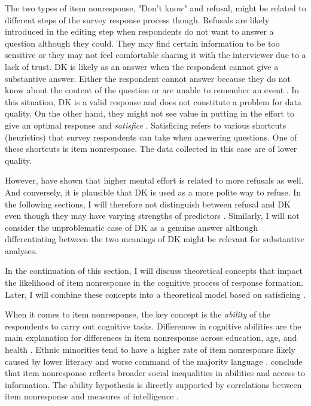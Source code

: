 \documentclass[a4paper,12pt]{article}
\begin{document}
The two types of item nonresponse, "Don't know" and refusal, might be related to different steps of the survey response process though. Refusals are likely introduced in the editing step when respondents do not want to answer a question although they could. They may find certain information to be too sensitive or they may not feel comfortable sharing it with the interviewer due to a lack of trust. DK is likely as an answer when the respondent cannot give a substantive answer. Either the respondent cannot answer because they do not know about the content of the question or are unable to remember an event \citep{beattyAnswerNotAnwer2002, turnerCanResponseLatencies2015}. In this situation, DK is a valid response and does not constitute a problem for data quality.
On the other hand, they might not see value in putting in the effort to give an optimal response and \textit{satisfice} \citep{krosnickResponseStrategiesCoping1991}. Satisficing refers to various shortcuts (heuristics) that survey respondents can take when answering questions. One of these shortcuts is item nonresponse. The data collected in this case are of lower quality.

However, \citet{shoemakerItemNonresponseDistinguishing2002}  have
shown that higher mental effort is related to more refusals as well. And
conversely, it is plausible that DK is used as a more polite way to refuse.
In the following sections, I will therefore not distinguish between refusal and DK even though they may have varying strengths of predictors \citep{silberEffectsQuestionRespondent2021}. Similarly, I will not consider the unproblematic case of DK as a genuine answer although differentiating between the two meanings of DK might be relevant for substantive analyses.

In the continuation of this section, I will discuss theoretical concepts that impact the likelihood of item nonresponse in the cognitive process of response formation. Later, I will combine these concepts into a theoretical model based on satisficing \citep{krosnickResponseStrategiesCoping1991}.

When it comes to item nonresponse, the key concept is the \textit{ability} of the respondents to carry out cognitive tasks. Differences in cognitive abilities are the main explanation for differences in item nonresponse across education, age, and health \citep{colsherDataQualityAge1989, pickeryImpactRespondentInterviewer1998, deleeuwPreventionTreatmentItem2003, messerDeterminantsItemNonresponse2012, silberEffectsQuestionRespondent2021}. Ethnic minorities tend to have a higher rate of item nonresponse likely caused by lower literacy and worse command of the majority language \citep{kupekDeterminantsItemNonresponse1998, pickeryImpactRespondentInterviewer1998}. \citet{meitingerPowerCultureItem2020} conclude that item nonresponse reflects broader social inequalities in abilities and access to information. The ability hypothesis is directly supported by correlations between item nonresponse and measures of intelligence \citep{hedengrenDogThatDidn2012}.
\end{document}
